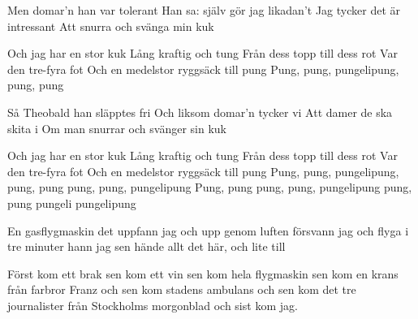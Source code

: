 {    Men domar'n han var tolerant
    Han sa: själv gör jag likadan't
    Jag tycker det är intressant
    Att snurra och svänga min kuk
   
    Och jag har en stor kuk
    Lång kraftig och tung
    Från dess topp till dess rot
    Var den tre-fyra fot
    Och en medelstor ryggsäck till pung
    Pung, pung, pungelipung, pung, pung
   
    Så Theobald han släpptes fri
    Och liksom domar'n tycker vi
    Att damer de ska skita i
    Om man snurrar och svänger sin kuk
   
    Och jag har en stor kuk
    Lång kraftig och tung
    Från dess topp till dess rot
    Var den tre-fyra fot
    Och en medelstor ryggsäck till pung
    Pung, pung, pungelipung, pung, pung
    pung, pung, pungelipung
    Pung, pung pung, pung, pungelipung
    pung, pung pungeli pungelipung}

\newpage 


\songtext{}En gasflygmaskin det uppfann jag
och upp genom luften försvann jag
och flyga i tre minuter hann jag
sen hände allt det här, och lite till

Först kom ett brak
sen kom ett vin
sen kom hela flygmaskin
sen kom en krans
från farbror Franz
och sen kom stadens ambulans
och sen kom det tre journalister
från Stockholms morgonblad
och sist kom jag.